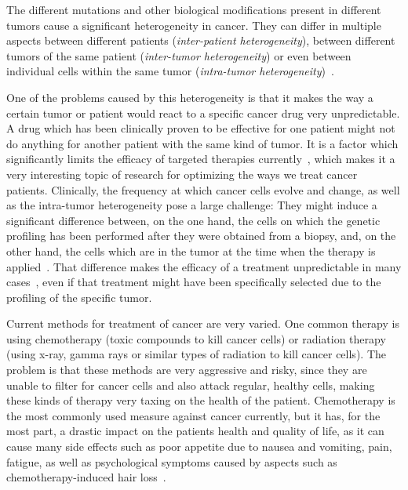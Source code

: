 The different mutations and other biological modifications present in different tumors cause a significant heterogeneity in cancer. They can differ in multiple aspects between different patients (\textit{inter-patient heterogeneity}), between different tumors of the same patient (\textit{inter-tumor heterogeneity}) or even between individual cells within the same tumor (\textit{intra-tumor heterogeneity})~\cite{heterogeneity-implications-targeted-therapeutics}.

One of the problems caused by this heterogeneity is that it makes the way a certain tumor or patient would react to a specific cancer drug very unpredictable. A drug which has been clinically proven to be effective for one patient might not do anything for another patient with the same kind of tumor. It is a factor which significantly limits the efficacy of targeted therapies currently~\cite{heterogeneity-is-it-a-problem}, which makes it a very interesting topic of research for optimizing the ways we treat cancer patients. Clinically, the frequency at which cancer cells evolve and change, as well as the intra-tumor heterogeneity pose a large challenge: They might induce a significant difference between, on the one hand, the cells on which the genetic profiling has been performed after they were obtained from a biopsy, and, on the other hand, the cells which are in the tumor at the time when the therapy is applied~\cite{heterogeneity-is-it-a-problem}. That difference makes the efficacy of a treatment unpredictable in many cases~\cite{narrative-review-heterogeneity-challenges}, even if that treatment might have been specifically selected due to the profiling of the specific tumor.

Current methods for treatment of cancer are very varied. One common therapy is using chemotherapy (toxic compounds to kill cancer cells) or radiation therapy (using x-ray, gamma rays or similar types of radiation to kill cancer cells). The problem is that these methods are very aggressive and risky, since they are unable to filter for cancer cells and also attack regular, healthy cells, making these kinds of therapy very taxing on the health of the patient. Chemotherapy is the most commonly used measure against cancer currently, but it has, for the most part, a drastic impact on the patients health and quality of life, as it can cause many side effects such as poor appetite due to nausea and vomiting, pain, fatigue, as well as psychological symptoms caused by aspects such as chemotherapy-induced hair loss~\cite{cancer-chemotherapy-and-beyond}.


